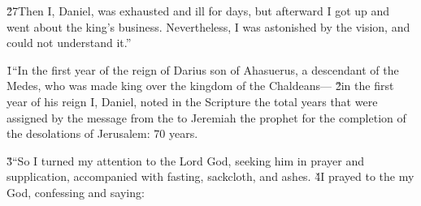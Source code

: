 \v{27}Then I, Daniel, was exhausted and ill for days, but afterward I got up and went about the king's business. Nevertheless, I was astonished by the vision, and could not understand it.''

\v{1}``In the first year of the reign of Darius son of Ahasuerus, a descendant of the Medes, who was made king over the kingdom of the Chaldeans--- \v{2}in the first year of his reign I, Daniel, noted in the Scripture the total years that were assigned by the message from the  to Jeremiah the prophet for the completion of the desolations of Jerusalem: 70 years.

\v{3}``So I turned my attention to the Lord God, seeking him in prayer and supplication, accompanied with fasting, sackcloth, and ashes. \v{4}I prayed to the  my God, confessing and saying:

